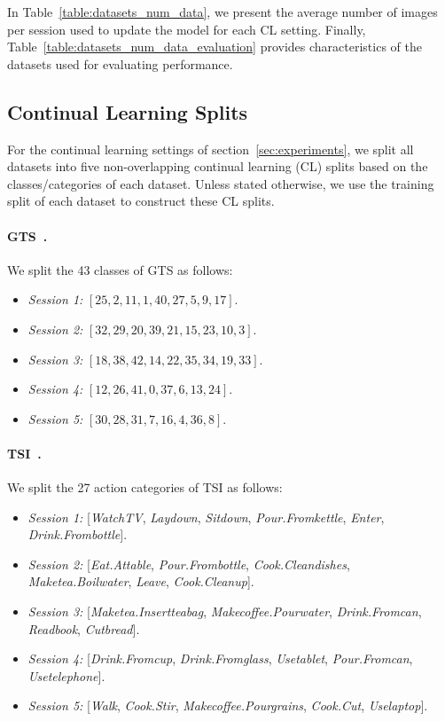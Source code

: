 In Table~\ref{table:datasets_num_data}, we present the average number of images per session used to update the model for each CL setting. Finally, Table~\ref{table:datasets_num_data_evaluation} provides characteristics of the datasets used for evaluating performance.

\subsection{Continual Learning Splits}
For the continual learning settings of section~\ref{sec:experiments}, we split all datasets into five non-overlapping continual learning (CL) splits based on the classes/categories of each dataset. Unless stated otherwise, we use the training split of each dataset to construct these CL splits.

\paragraph{GTS~\cite{stallkamp2012man}.} We split the 43 classes of GTS as follows:
\begin{itemize}
    \item \emph{Session 1:} $\left[ 25, 2, 11,  1, 40, 27,  5,  9, 17 \right]$.
    \item \emph{Session 2:} $\left[ 32, 29, 20, 39, 21, 15, 23, 10, 3 \right]$.
    \item \emph{Session 3:} $\left[ 18, 38, 42, 14, 22, 35, 34, 19, 33 \right]$.
    \item \emph{Session 4:} $\left[ 12, 26, 41, 0, 37, 6, 13, 24 \right]$.
    \item \emph{Session 5:} $\left[ 30, 28, 31, 7, 16, 4, 36, 8 \right]$.
\end{itemize}

\paragraph{TSI~\cite{das2019toyota}.} We split the 27 action categories of TSI as follows:
\begin{itemize}
    \item \emph{Session 1:} [\textit{WatchTV}, \textit{Laydown}, \textit{Sitdown}, \textit{Pour.Fromkettle}, \textit{Enter}, \textit{Drink.Frombottle}].
    \item \emph{Session 2:} [\textit{Eat.Attable}, \textit{Pour.Frombottle}, \textit{Cook.Cleandishes}, \textit{Maketea.Boilwater}, \textit{Leave}, \textit{Cook.Cleanup}].
    \item \emph{Session 3:} [\textit{Maketea.Insertteabag}, \textit{Makecoffee.Pourwater}, \textit{Drink.Fromcan}, \textit{Readbook}, \textit{Cutbread}].
    \item \emph{Session 4:} [\textit{Drink.Fromcup}, \textit{Drink.Fromglass}, \textit{Usetablet}, \textit{Pour.Fromcan}, \textit{Usetelephone}].
    \item \emph{Session 5:} [\textit{Walk}, \textit{Cook.Stir}, \textit{Makecoffee.Pourgrains}, \textit{Cook.Cut}, \textit{Uselaptop}].
\end{itemize}

